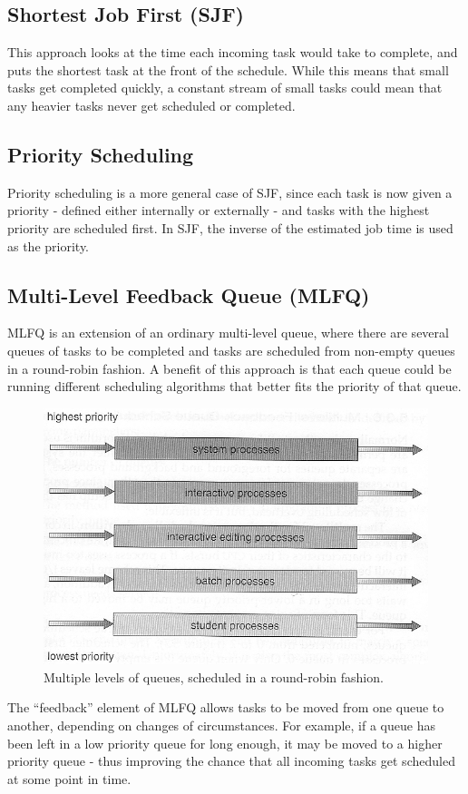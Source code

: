 \documentclass[a4paper,11pt,titlepage]{report}
\begin{document}
\subsection{Shortest Job First (SJF)}
This approach looks at the time each incoming task would take to complete, and puts the shortest task at the front of the schedule. While this means that small tasks get completed quickly, a constant stream of small tasks could mean that any heavier tasks never get scheduled or completed.

\subsection{Priority Scheduling}
Priority scheduling is a more general case of SJF, since each task is now given a priority - defined either internally or externally - and tasks with the highest priority are scheduled first. In SJF, the inverse of the estimated job time is used as the priority.

\subsection{Multi-Level Feedback Queue (MLFQ)}
MLFQ is an extension of an ordinary multi-level queue, where there are several queues of tasks to be completed and tasks are scheduled from non-empty queues in a round-robin fashion. A benefit of this approach is that each queue could be running different scheduling algorithms that better fits the priority of that queue.\\

\begin{figure}[!hbpt]
  \center
  \includegraphics[width=0.6\linewidth]{img/mlqs.jpg}
  \caption{Multiple levels of queues, scheduled in a round-robin fashion. \cite{Bell2018}}
  \label{fig:mlqs}
\end{figure}

The ``feedback'' element of MLFQ allows tasks to be moved from one queue to another, depending on changes of circumstances. For example, if a queue has been left in a low priority queue for long enough, it may be moved to a higher priority queue - thus improving the chance that all incoming tasks get scheduled at some point in time.
\end{document}
